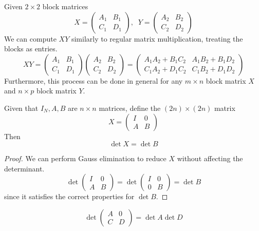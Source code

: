 \documentclass{article}
\begin{document}
    \begin{theorem}
    Given $2 \times 2$ block matrices
    \[X = \begin{pmatrix}
    A_1&B_1\\C_1&D_1
    \end{pmatrix}, \; \; Y = \begin{pmatrix}
    A_2&B_2\\C_2&D_2
    \end{pmatrix}\]
    We can compute $X Y$ similarly to regular matrix multiplication, treating the blocks as entries. 
    \[ X Y = \begin{pmatrix}
    A_1&B_1\\C_1&D_1
    \end{pmatrix} \begin{pmatrix}
    A_2&B_2\\C_2&D_2
    \end{pmatrix} = \begin{pmatrix}
    A_1 A_2 + B_1 C_2 & A_1 B_2 + B_1 D_2 \\
    C_1 A_2 + D_1 C_2 & C_1 B_2 + D_1 D_2 
    \end{pmatrix}\]
    Furthermore, this process can be done in general for any $m \times n$ block matrix $X$ and $n \times p$ block matrix $Y$. 
    \end{theorem}

    \begin{theorem}
    Given that $I_N, A, B$ are $n \times n$ matrices, define the $(2n) \times (2n)$ matrix 
    \[X = \begin{pmatrix}
    I & 0 \\ A & B
    \end{pmatrix}\]
    Then 
    \[\det{X} = \det{B}\]
    \end{theorem}
    \begin{proof}
    We can perform Gauss elimination to reduce $X$ without affecting the determinant.
    \[\det{\begin{pmatrix}
    I&0\\A&B
    \end{pmatrix}} = \det{
    \begin{pmatrix}
    I&0\\
    0&B
    \end{pmatrix}} = \det{B}\]
    since it satisfies the correct properties for $\det{B}$. 
    \end{proof}

    \begin{corollary}
    \[\det{\begin{pmatrix}
    A&0\\C&D
    \end{pmatrix}} = \det{A} \det{D}\]
    \end{corollary}
\end{document}
